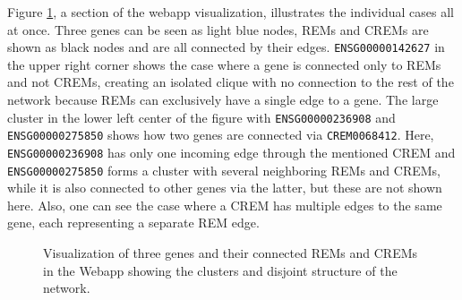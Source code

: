 \documentclass[pdftex,12pt,a4paper]{report}
\begin{document}
Figure \ref{network_webapp}, a section of the webapp visualization, illustrates the individual cases all at once. Three genes can be seen as light blue nodes, REMs and CREMs are shown as black nodes and are all connected by their edges. \texttt{ENSG00000142627} in the upper right corner shows the case where a gene is connected only to REMs and not CREMs, creating an isolated clique with no connection to the rest of the network because REMs can exclusively have a single edge to a gene. The large cluster in the lower left center of the figure with \texttt{ENSG00000236908} and \texttt{ENSG00000275850} shows how two genes are connected via \texttt{CREM0068412}. Here, \texttt{ENSG00000236908} has only one incoming edge through the mentioned CREM and \texttt{ENSG00000275850} forms a cluster with several neighboring REMs and CREMs, while it is also connected to other genes via the latter, but these are not shown here. Also, one can see the case where a CREM has multiple edges to the same gene, each representing a separate REM edge.
\begin{figure}[!ht]
\begin{center}
	\caption{Visualization of three genes and their connected REMs and CREMs in the Webapp showing the clusters and disjoint structure of the network.}
	\label{network_webapp}
\end{center}
\end{figure}
\end{document}
